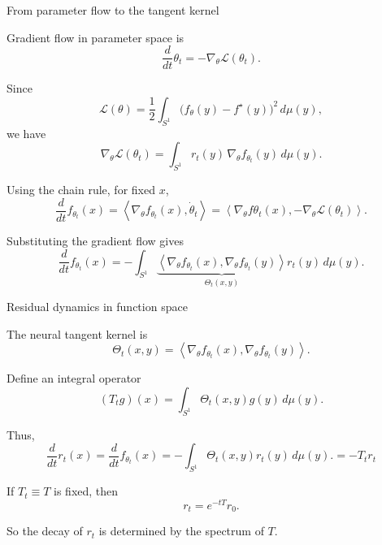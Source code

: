 \documentclass[10pt,aspectratio=169]{beamer}
\begin{document}
\begin{frame}{From parameter flow to the tangent kernel}

	Gradient flow in parameter space is
	\[
		\frac{d}{dt}\theta_t
		=
		-\nabla_\theta \mathcal L(\theta_t).
	\]

	\pause
	Since
	\[
		\mathcal L(\theta)
		=
		\frac12
		\int_{S^1}
		\bigl(f_\theta(y)-f^\star(y)\bigr)^2
		\,d\mu(y),
	\]
	\pause
	we have
	\[
		\nabla_\theta \mathcal L(\theta_t)
		=
		\int_{S^1}
		r_t(y)\,\nabla_\theta f_{\theta_t}(y)
		\,d\mu(y).
	\]

	\pause
	Using the chain rule, for fixed \(x\),
	\[
		\frac{d}{dt} f_{\theta_t}(x)
		=
		\left\langle
		\nabla_\theta f_{\theta_t}(x),
		\dot\theta_t
		\right\rangle
		= \left\langle \nabla_\theta f{\theta_t}(x), -\nabla_\theta \mathcal L(\theta_t) \right\rangle.
	\]

	\pause
	Substituting the gradient flow gives
	\[
		\frac{d}{dt} f_{\theta_t}(x)
		=
		-
		\int_{S^1}
		\underbrace{
			\left\langle
			\nabla_\theta f_{\theta_t}(x),
			\nabla_\theta f_{\theta_t}(y)
			\right\rangle
		}_{\Theta_t(x,y)}
		r_t(y)
		\,d\mu(y).
	\]


\end{frame}

\begin{frame}{Residual dynamics in function space}

	The neural tangent kernel is
	\[
		\Theta_t(x,y)
		=
		\left\langle
		\nabla_\theta f_{\theta_t}(x),
		\nabla_\theta f_{\theta_t}(y)
		\right\rangle .
	\]

	\pause
	Define an integral operator
	\[
		(T_t g)(x)
		=
		\int_{S^1}
		\Theta_t(x,y)g(y)\,d\mu(y).
	\]

	\pause
	Thus,
	\[
		\frac{d}{dt} r_t(x)
		=
		\frac{d}{dt} f_{\theta_t}(x)
		=
		-
		\int_{S^1}
		\Theta_t(x,y)
		r_t(y)
		\,d\mu(y).
		=
		-T_t r_t
	\]

	If \(T_t\equiv T\) is fixed, then
	\[
		r_t
		=
		e^{-tT}r_0.
	\]

	So the decay of \(r_t\) is determined by the spectrum of \(T\).


\end{frame}
\end{document}

